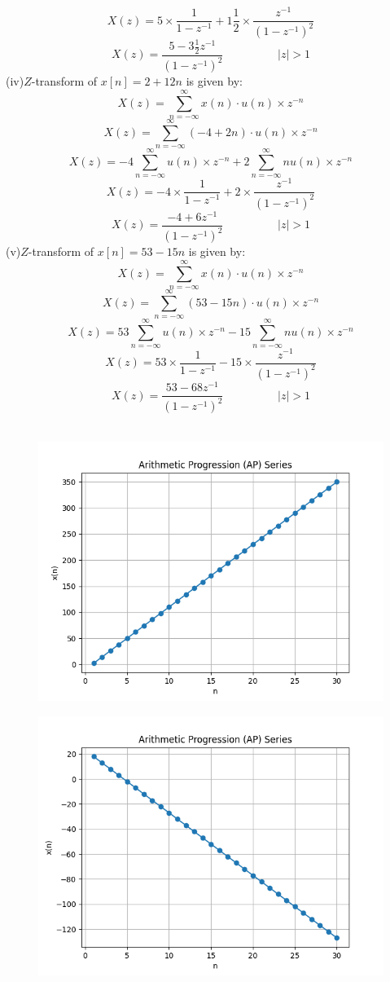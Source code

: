 \documentclass[journal,12pt,twocolumn]{IEEEtran}
\theoremstyle{remark}
\begin{document}
\[X(z)=5 \times \frac{1}{1-{z^{-1}}}+ 1\frac{1}{2}\times \frac{z^{-1}}{(1-{z^{-1}})^2}\]
\[X(z)=\frac{5-3\frac{1}{2}{z^{-1}}}{(1-{z^{-1}})^2} \hspace{2cm}  |z|>1\]
(iv)$Z$-transform of $x[n] = 2 + 12n$ is given by:
\[ X(z) = \sum_{n=-\infty}^{\infty} x(n)\cdot u(n)\times z^{-n} \]
\[ X(z) = \sum_{n=-\infty}^{\infty} (-4 + 2n)\cdot u(n) \times z^{-n} \]
\[X(z)=-4 \sum_{n=-\infty}^{\infty}u(n) \times z^{-n}+2 \sum_{n=-\infty}^{\infty} nu(n) \times z^{-n}\]
\[X(z)=-4 \times \frac{1}{1-{z^{-1}}}+ 2 \times \frac{z^{-1}}{(1-{z^{-1}})^2}\]
\[X(z)=\frac{-4+6{z^{-1}}}{(1-{z^{-1}})^2} \hspace{2cm}  |z|>1\]
(v)$Z$-transform of $x[n] = 53 - 15n$ is given by:
\[ X(z) = \sum_{n=-\infty}^{\infty} x(n)\cdot u(n)\times z^{-n} \]
\[ X(z) = \sum_{n=-\infty}^{\infty} (53 - 15n)\cdot u(n) \times z^{-n} \]
\[X(z)=53 \sum_{n=-\infty}^{\infty}u(n)\times z^{-n}-15 \sum_{n=-\infty}^{\infty} nu(n)\times z^{-n}\]
\[X(z)=53 \times \frac{1}{1-{z^{-1}}}- 15 \times \frac{z^{-1}}{(1-{z^{-1}})^2}\]
\[X(z)=\frac{53-68{z^{-1}}}{(1-{z^{-1}})^2} \hspace{2cm}  |z|>1\]\\
\begin{figure}[h]
       \vspace*{-1cm}
       \centering
        \includegraphics[width=0.8\linewidth]{figures/download.png} %
        \caption{}
   \label{fig:your_label}
\end{figure}
\begin{figure}[h]
      \vspace*{-1cm}
      \centering
       \includegraphics[width=0.8\linewidth]{figures/download2.png} %
        \caption{}
    \end{figure}
\end{document}
